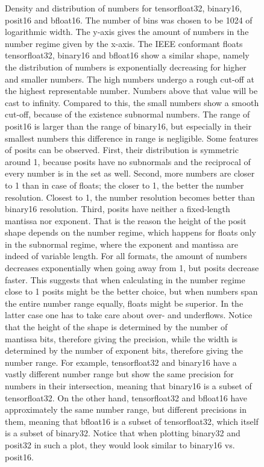 \documentclass{article}
\theoremstyle{plain} %
\theoremstyle{convention} %
\theoremstyle{remark} %
\numberwithin{equation}{section}
\begin{document}
\begin{figure}[ht]
    \caption{Density and distribution of numbers for \gls{tensorfloat32}, \gls{binary16}, \gls{posit16} and \gls{bfloat16}. The number of bins was chosen to be \num{1024} of logarithmic width. The y-axis gives the amount of numbers in the number regime given by the x-axis. The IEEE conformant floats \gls{tensorfloat32}, \gls{binary16} and \gls{bfloat16} show a similar shape, namely the distribution of numbers is exponentially decreasing for higher and smaller numbers. The high numbers undergo a rough cut-off at the highest representable number. Numbers above that value will be cast to infinity. Compared to this, the small numbers show a smooth cut-off, because of the existence subnormal numbers. The range of \gls{posit16} is larger than the range of \gls{binary16}, but especially in their smallest numbers this difference in range is negligible. Some features of posits can be observed. First, their distribution is symmetric around \num{1}, because posits have no subnormals and the reciprocal of every number is in the set as well. Second, more numbers are closer to \num{1} than in case of floats; the closer to \num{1}, the better the number resolution. Closest to \num{1}, the number resolution becomes better than \gls{binary16} resolution. Third, posits have neither a fixed-length mantissa nor exponent. That is the reason the height of the posit shape depends on the number regime, which happens for floats only in the subnormal regime, where the exponent and mantissa are indeed of variable length. For all formats, the amount of numbers decreases exponentially when going away from \num{1}, but posits decrease faster. This suggests that when calculating in the number regime close to \num{1} posits might be the better choice, but when numbers span the entire number range equally, floats might be superior. In the latter case one has to take care about over- and underflows. Notice that the height of the shape is determined by the number of mantissa bits, therefore giving the precision, while the width is determined by the number of exponent bits, therefore giving the number range. For example, \gls{tensorfloat32} and \gls{binary16} have a vastly different number range but show the same precision for numbers in their intersection, meaning that \gls{binary16} is a subset of \gls{tensorfloat32}. On the other hand, \gls{tensorfloat32} and \gls{bfloat16} have approximately the same number range, but different precisions in them, meaning that \gls{bfloat16} is a subset of \gls{tensorfloat32}, which itself is a subset of \gls{binary32}. Notice that when plotting \gls{binary32} and \gls{posit32} in such a plot, they would look similar to \gls{binary16} vs. \gls{posit16}.}
    \label{fig:number_line}
\end{figure}
\end{document}
